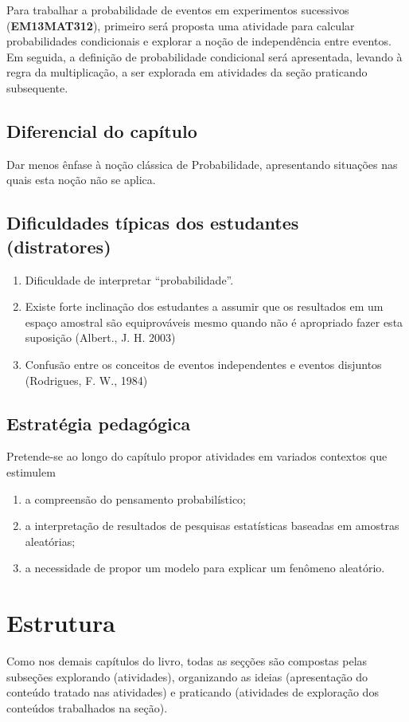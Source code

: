 \begin{apresentacao}
Para trabalhar a probabilidade de eventos em experimentos sucessivos (\textbf{EM13MAT312}), primeiro será proposta uma atividade para calcular probabilidades condicionais e explorar a noção de independência entre eventos. Em seguida, a definição de probabilidade condicional será apresentada, levando à regra da multiplicação, a ser explorada em atividades da seção praticando subsequente.

\subsection{Diferencial do capítulo}
Dar menos ênfase à noção clássica de Probabilidade, apresentando situações nas quais esta noção não se aplica.

\subsection{Dificuldades típicas dos estudantes (distratores)}
\begin{enumerate}
\item Dificuldade de interpretar “probabilidade”.
\item Existe forte inclinação dos estudantes a assumir que os resultados em um espaço amostral são equiprováveis mesmo quando não é apropriado fazer esta suposição (Albert., J. H. 2003)
\item Confusão entre os conceitos de eventos independentes e eventos disjuntos (Rodrigues, F. W., 1984)
\end{enumerate}

\subsection{Estratégia pedagógica}
Pretende-se ao longo do capítulo propor atividades em variados contextos que estimulem

\begin{enumerate}
\item a compreensão do pensamento probabilístico;
\item a interpretação de resultados de pesquisas estatísticas baseadas em amostras aleatórias;
\item a necessidade de propor um modelo para explicar um fenômeno aleatório.
\end{enumerate}

\section{Estrutura}
Como nos demais capítulos do livro, todas as seçções são compostas pelas subseções explorando (atividades), organizando as ideias (apresentação do conteúdo tratado nas atividades) e praticando (atividades de exploração dos conteúdos trabalhados na seção).


\end{apresentacao}
